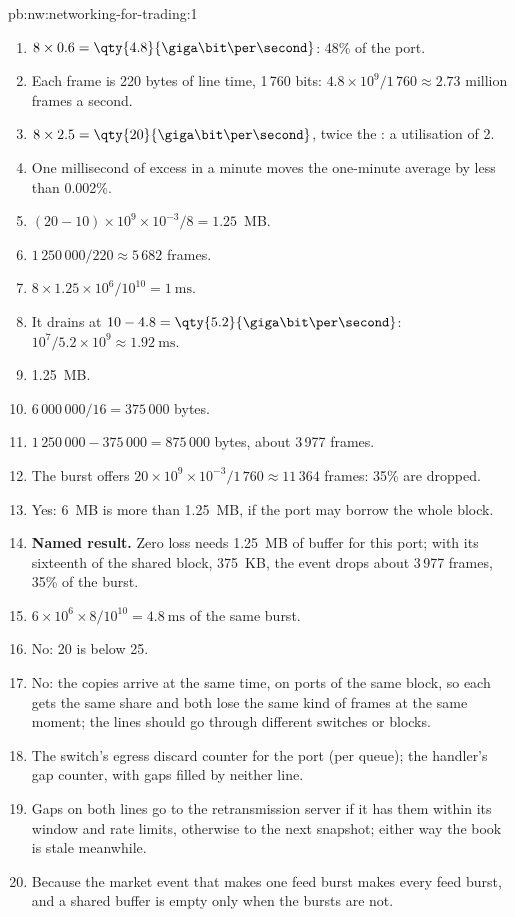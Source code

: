\begin{solution}{pb:nw:networking-for-trading:1}
\begin{enumerate}
\item $8 \times 0.6 = \qty{4.8}{\giga\bit\per\second}$: 48\% of the port.
\item Each frame is 220 bytes of line time, 1\,760 bits: $4.8 \times 10^9 / 1\,760 \approx 2.73$ million frames a second.
\item $8 \times 2.5 = \qty{20}{\giga\bit\per\second}$, twice the : a utilisation of 2.
\item One millisecond of excess in a minute moves the one-minute average by less than 0.002\%.
\item $(20 - 10) \times 10^9 \times 10^{-3} / 8 = 1.25$~MB.
\item $1\,250\,000 / 220 \approx 5\,682$ frames.
\item $8 \times 1.25 \times 10^6 / 10^{10} = \qty{1}{\milli\second}$.
\item It drains at $10 - 4.8 = \qty{5.2}{\giga\bit\per\second}$: $10^7 / 5.2 \times 10^9 \approx \qty{1.92}{\milli\second}$.
\item 1.25~MB.
\item $6\,000\,000 / 16 = 375\,000$ bytes.
\item $1\,250\,000 - 375\,000 = 875\,000$ bytes, about 3\,977 frames.
\item The burst offers $20 \times 10^9 \times 10^{-3} / 1\,760 \approx 11\,364$ frames: 35\% are dropped.
\item Yes: 6~MB is more than 1.25~MB, if the port may borrow the whole block.
\item \textbf{Named result.} Zero loss needs 1.25~MB of buffer for this port; with its sixteenth of the shared block, 375~KB, the
event drops about 3\,977 frames, 35\% of the burst.
\item $6 \times 10^6 \times 8 / 10^{10} = \qty{4.8}{\milli\second}$ of the same burst.
\item No: 20 is below 25.
\item No: the copies arrive at the same time, on ports of the same block, so each gets the same share and both lose the same
kind of frames at the same moment; the lines should go through different switches or blocks.
\item The switch's egress discard counter for the port (per queue); the handler's gap counter, with gaps filled by neither line.
\item Gaps on both lines go to the retransmission server if it has them within its window and rate limits, otherwise to the next
snapshot; either way the book is stale meanwhile.
\item Because the market event that makes one feed burst makes every feed burst, and a shared buffer is empty only when the
bursts are not.
\end{enumerate}
\end{solution}

